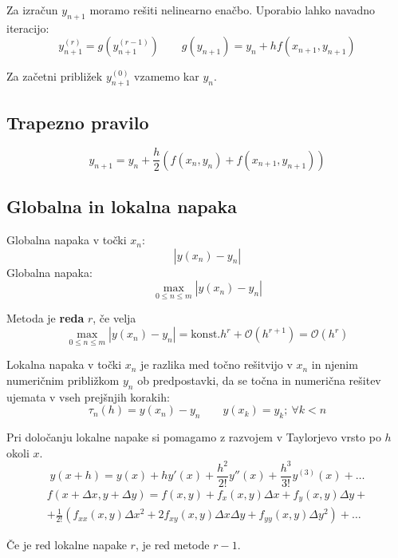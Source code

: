 \begin{multicols}{5}
Za izračun $y_{n+1}$ moramo rešiti nelinearno enačbo. Uporabio lahko navadno iteracijo:
\[ y_{n+1}^{(r)} = g(y_{n+1}^{(r-1)}) \qquad g(y_{n+1}) = y_n + hf(x_{n+1}, y_{n+1}) \]

Za začetni približek $y_{n+1}^{(0)}$ vzamemo kar $y_n$.

\subsection*{Trapezno pravilo}
\[ y_{n+1} = y_n + \frac{h}{2}\left(f(x_n, y_n) + f(x_{n+1}, y_{n+1})\right)\]

\subsection*{Globalna in lokalna napaka}
Globalna napaka v točki $x_n$:
\[ |y(x_n) - y_n | \]
Globalna napaka:
\[\max_{0 \leq n \leq m} |y(x_n) - y_n |\]

Metoda je \textbf{reda} $r$, če velja
\[ \max_{0 \leq n \leq m} |y(x_n) - y_n| = \text{konst.} h^r + \mathcal{O}\left(h^{r+1}\right) = \mathcal{O}\left(h^r\right)\]

Lokalna napaka v točki $x_n$ je razlika med točno rešitvijo v $x_n$ in njenim numeričnim približkom $y_n$
ob predpostavki, da se točna in numerična rešitev ujemata v vseh prejšnjih korakih:
\[ \tau_n(h) = y(x_n) - y_n \qquad y(x_k) = y_k; \ \forall k < n\]

Pri določanju lokalne napake si pomagamo z razvojem v Taylorjevo vrsto po $h$ okoli $x$.
\[ y(x+h) = y(x) + hy'(x)+\frac{h^2}{2!}y''(x) + \frac{h^3}{3!}y^{(3)}(x) + \dots\]
\begin{multline*}
    f(x + \Delta x, y + \Delta y) = f(x,y) + f_x(x,y)\Delta x + f_y(x,y) \Delta y + \\
    + \frac{1}{2!}\left( f_{xx}(x,y)\Delta x^2 + 2 f_{xy}(x,y) \Delta x \Delta y + f_{yy}(x,y) \Delta y^2\right) + \dots
\end{multline*}

Če je red lokalne napake $r$, je red metode $r-1$.


\end{multicols}
